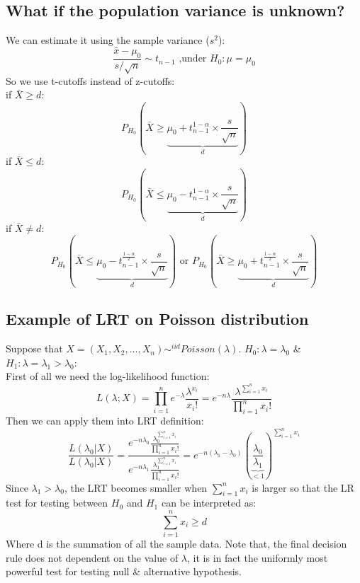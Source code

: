 \documentclass[12pt ]{article}
\begin{document}
\subsection{What if the population variance is unknown?}
We can estimate it using the sample variance ($s^2$):
\begin{equation*}
\frac{\bar{x} - \mu_{0}}{s/\sqrt{n}} \sim t_{n-1}            \text{             ,under $H_{0}: \mu = \mu_{0}$}
\end{equation*}
So we use t-cutoffs instead of z-cutoffs: \\
if $\bar{X} \geq d$:
\begin{equation*}
P_{H_{0}} (\bar{X} \geq  \underbrace{\mu_{0} + t^{1-\alpha}_{n-1} \times \frac{s}{\sqrt{n}}}_{d})
\end{equation*}
if $\bar{X} \leq d$:
\begin{equation*}
P_{H_{0}} (\bar{X} \leq  \underbrace{\mu_{0} - t^{1-\alpha}_{n-1} \times \frac{s}{\sqrt{n}}}_{d})
\end{equation*}
if $\bar{X} \neq d$:
\begin{equation*}
P_{H_{0}} (\bar{X} \leq  \underbrace{\mu_{0} - t^{\frac{1-\alpha}{2}}_{n-1} \times \frac{s}{\sqrt{n}}}_{d}) \text{   or   } P_{H_{0}} (\bar{X} \geq  \underbrace{\mu_{0} + t^{\frac{1-\alpha}{2}}_{n-1} \times \frac{s}{\sqrt{n}}}_{d})
\end{equation*}
\subsection{Example of LRT on Poisson distribution}
Suppose that $X = (X_{1}, X_{2}, \ldots, X_{n}) \sim^{iid} Poisson(\lambda)$. $H_{0}: \lambda = \lambda_{0}$ \& $H_{1}: \lambda = \lambda_{1} > \lambda_{0}$: \\
First of all we need the log-likelihood function:
\begin{equation*}
L(\lambda;X) = \prod_{i=1}^{n} e^{-\lambda} \frac{\lambda^{x_{i}}}{x_{i}!} = e^{-n\lambda} \frac{\lambda^{\sum_{i=1}^{n} x_{i}}}{\prod_{i=1}^{n}x_{i}!}
\end{equation*}
Then we can apply them into LRT definition:
\begin{equation*}
\frac{L(\lambda_{0} | X)}{L(\lambda_{0} | X)} = \frac{e^{-n\lambda_{0}} \frac{\lambda_{0}^{\sum_{i=1}^{n} x_{i}}}{\prod_{i=1}^{n}x_{i}!}}{e^{-n\lambda_{1}} \frac{\lambda_{1}^{\sum_{i=1}^{n} x_{i}}}{\prod_{i=1}^{n}x_{i}!}} = e^{-n(\lambda_{1}-\lambda_{0})} (\underbrace{\frac{\lambda_{0}}{\lambda_{1}}}_{ < 1})^{\sum_{i=1}^{n} x_{i}}
\end{equation*}
Since $\lambda_{1} > \lambda_{0}$, the LRT becomes smaller when $\sum_{i=1}^{n} x_{i}$ is larger so that the LR test for testing between $H_{0}$ and $H_{1}$ can be interpreted as:
\begin{equation*}
\sum_{i=1}^{n} x_{i} \geq d
\end{equation*}
Where d is the summation of all the sample data. Note that, the final decision rule does not dependent on the value of $\lambda$, it is in fact the uniformly most powerful test for testing null \& alternative hypothesis. \\
\end{document}
